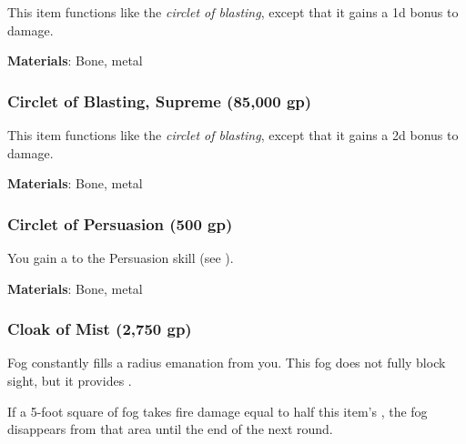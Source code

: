 This item functions like the \textit{circlet of blasting}, except that it gains a \plus1d bonus to damage.



\vspace{0.25em}
\textbf{Materials}: Bone, metal


\lowercase{\hypertarget{item:Circlet of Blasting, Supreme}{}}\label{item:Circlet of Blasting, Supreme}
\hypertarget{item:Circlet of Blasting, Supreme}{\subsubsection{Circlet of Blasting, Supreme\hfill{} (85,000 gp)}}

This item functions like the \textit{circlet of blasting}, except that it gains a \plus2d bonus to damage.



\vspace{0.25em}
\textbf{Materials}: Bone, metal


\lowercase{\hypertarget{item:Circlet of Persuasion}{}}\label{item:Circlet of Persuasion}
\hypertarget{item:Circlet of Persuasion}{\subsubsection{Circlet of Persuasion\hfill{} (500 gp)}}

You gain a   to the Persuasion skill (see ).



\vspace{0.25em}
\textbf{Materials}: Bone, metal


\lowercase{\hypertarget{item:Cloak of Mist}{}}\label{item:Cloak of Mist}
\hypertarget{item:Cloak of Mist}{\subsubsection{Cloak of Mist\hfill{} (2,750 gp)}}

Fog constantly fills a \areamed radius emanation from you.
This fog does not fully block sight, but it provides \concealment.

If a 5-foot square of fog takes fire damage equal to half this item's , the fog disappears from that area until the end of the next round.



